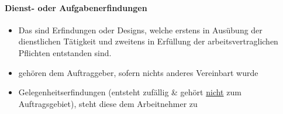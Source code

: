\paragraph{Dienst- oder Aufgabenerfindungen}
\begin{itemize}
    \item Das sind Erfindungen oder Designs, welche erstens in Ausübung der dienstlichen Tätigkeit und zweitens in Erfüllung der arbeitsvertraglichen Pflichten entstanden sind.
    \item gehören dem Auftraggeber, sofern nichts anderes Vereinbart wurde
    \item Gelegenheitserfindungen (entsteht zufällig \& gehört \underline{nicht} zum Auftragsgebiet), steht diese dem Arbeitnehmer zu
\end{itemize}